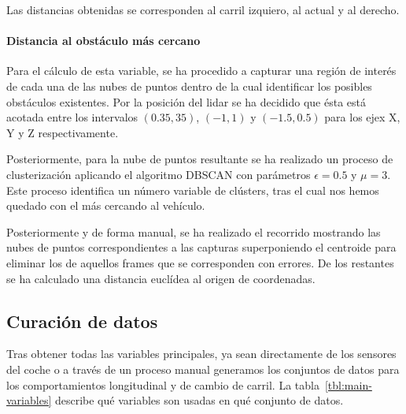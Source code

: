 Las distancias obtenidas se corresponden al carril izquiero, al actual y al derecho.

\paragraph{Distancia al obstáculo más cercano}

Para el cálculo de esta variable, se ha procedido a capturar una región de interés de cada una de las nubes de puntos dentro de la cual identificar los posibles obstáculos existentes. Por la posición del lidar se ha decidido que ésta está acotada entre los intervalos $(0.35, 35)$, $(-1, 1)$ y $(-1.5, 0.5)$ para los ejex X, Y y Z respectivamente.

Posteriormente, para la nube de puntos resultante se ha realizado un proceso de clusterización aplicando el algoritmo DBSCAN con parámetros $\epsilon = 0.5$ y $\mu = 3$. Este proceso identifica un número variable de clústers, tras el cual nos hemos quedado con el más cercando al vehículo.

Posteriormente y de forma manual, se ha realizado el recorrido mostrando las nubes de puntos correspondientes a las capturas superponiendo el centroide para eliminar los de aquellos frames que se corresponden con errores. De los restantes se ha calculado una distancia euclídea al origen de coordenadas.

\subsection{Curación de datos}

Tras obtener todas las variables principales, ya sean directamente de los sensores del coche o a través de un proceso manual generamos los conjuntos de datos para los comportamientos longitudinal y de cambio de carril. La tabla~\ref{tbl:main-variables} describe qué variables son usadas en qué conjunto de datos.

